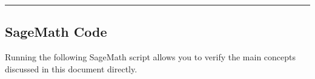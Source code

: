 \documentclass[
]{article}
\newenvironment{Shaded}{}{}
\newcommand{\BuiltInTok}[1]{\textcolor[rgb]{0.00,0.50,0.00}{#1}}
\newcommand{\CommentTok}[1]{\textcolor[rgb]{0.38,0.63,0.69}{\textit{#1}}}
\newcommand{\DecValTok}[1]{\textcolor[rgb]{0.25,0.63,0.44}{#1}}
\newcommand{\NormalTok}[1]{#1}
\newcommand{\OperatorTok}[1]{\textcolor[rgb]{0.40,0.40,0.40}{#1}}
\newcommand{\SpecialCharTok}[1]{\textcolor[rgb]{0.25,0.44,0.63}{#1}}
\newcommand{\SpecialStringTok}[1]{\textcolor[rgb]{0.73,0.40,0.53}{#1}}
\newcommand{\StringTok}[1]{\textcolor[rgb]{0.25,0.44,0.63}{#1}}
\begin{document}
\begin{center}\rule{0.5\linewidth}{0.5pt}\end{center}

\subsection{SageMath Code}\label{sagemath-practice-code}

Running the following SageMath script allows you to verify the main
concepts discussed in this document directly.

%
%
%
%
%
\end{document}
